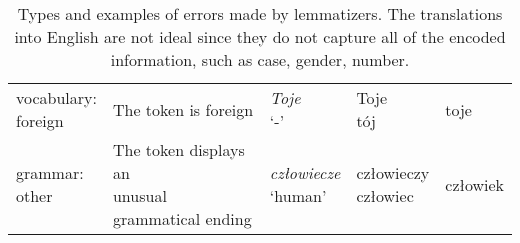 \begin{table}[H]
\begin{center}
{\begin{tabular}{p{2cm}p{4.5cm}p{3.5cm}p{1.75cm}p{1.75cm}}
\makecell[l]{vocabulary: \\ foreign} & The token is foreign & \makecell[l]{\textit{Toje} \\ `-'} & \makecell[l]{Toje \\ tój} & toje \\

\makecell[l]{grammar: \\ other} & \makecell[l]{The token displays an \\ unusual grammatical ending} & \makecell[l]{\textit{człowiecze} \\ `human'} & \makecell[l]{człowieczy \\ człowiec} & człowiek \\

\bottomrule
\end{tabular}}
\end{center}
\caption{\label{table:error-type-explanations} Types and examples of errors made by lemmatizers. The translations into English are not ideal since they do not capture all of the encoded information, such as case, gender, number.}
\end{table}
\newpage

